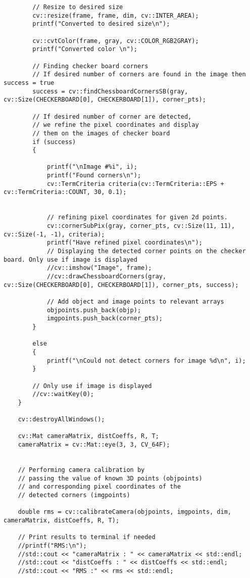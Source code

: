 \begin{appendices}
\begin{verbatim}
		// Resize to desired size
		cv::resize(frame, frame, dim, cv::INTER_AREA);
		printf("Converted to desired size\n");

		cv::cvtColor(frame, gray, cv::COLOR_RGB2GRAY);
		printf("Converted color \n");

		// Finding checker board corners
		// If desired number of corners are found in the image then success = true  
		success = cv::findChessboardCornersSB(gray, cv::Size(CHECKERBOARD[0], CHECKERBOARD[1]), corner_pts);

		// If desired number of corner are detected,
		// we refine the pixel coordinates and display
		// them on the images of checker board
		if (success)
		{

			printf("\nImage #%i", i);
			printf("Found corners\n");
			cv::TermCriteria criteria(cv::TermCriteria::EPS + cv::TermCriteria::COUNT, 30, 0.1);


			// refining pixel coordinates for given 2d points.
			cv::cornerSubPix(gray, corner_pts, cv::Size(11, 11), cv::Size(-1, -1), criteria);
			printf("Have refined pixel coordinates\n");
			// Displaying the detected corner points on the checker board. Only use if image is displayed
			//cv::imshow("Image", frame);
			//cv::drawChessboardCorners(gray, cv::Size(CHECKERBOARD[0], CHECKERBOARD[1]), corner_pts, success);

			// Add object and image points to relevant arrays
			objpoints.push_back(objp);
			imgpoints.push_back(corner_pts);
		}

		else
		{
			printf("\nCould not detect corners for image %d\n", i);
		}

		// Only use if image is displayed
		//cv::waitKey(0);
	}

	cv::destroyAllWindows();

	cv::Mat cameraMatrix, distCoeffs, R, T;
	cameraMatrix = cv::Mat::eye(3, 3, CV_64F);

	
	// Performing camera calibration by
	// passing the value of known 3D points (objpoints)
	// and corresponding pixel coordinates of the
	// detected corners (imgpoints)
	
	double rms = cv::calibrateCamera(objpoints, imgpoints, dim, cameraMatrix, distCoeffs, R, T);

	// Print results to terminal if needed
	//printf("RMS:\n");
	//std::cout << "cameraMatrix : " << cameraMatrix << std::endl;
	//std::cout << "distCoeffs : " << distCoeffs << std::endl;
	//std::cout << "RMS :" << rms << std::endl;

	


\end{verbatim}
\end{appendices}
